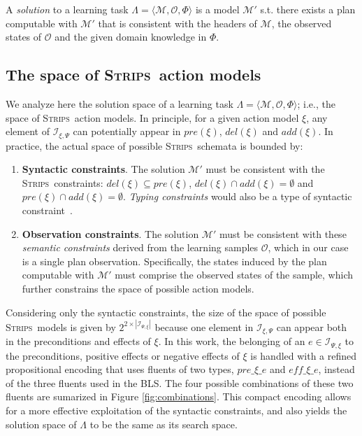\documentclass{article}
\newcommand{\tup}[1]{{\langle #1 \rangle}}
\newcommand{\strips}{\textsc{Strips}}
\begin{document}
A {\em solution} to a learning task $\Lambda=\tup{\mathcal{M},{\mathcal O},\Phi}$ is a model $\mathcal{M}'$ s.t. there exists a plan computable with $\mathcal{M}'$ that is consistent with the headers of $\mathcal{M}$, the observed states of $\mathcal{O}$ and the given domain knowledge in $\Phi$.

\subsection{The space of \strips\ action models}

We analyze here the solution space of a learning task $\Lambda=\tup{\mathcal{M},{\mathcal O},\Phi}$; i.e., the space of \strips\ action models. In principle, for a given action model $\xi$, any element of ${\mathcal I}_{\xi,\Psi}$ can potentially appear in $pre(\xi)$, $del(\xi)$ and $add(\xi)$. In practice, the actual space of possible \strips\ schemata is bounded by:

\begin{enumerate}
\item {\bf Syntactic constraints}. The solution $\mathcal{M}'$ must be consistent with the \strips\ constraints: $del(\xi)\subseteq pre(\xi)$, $del(\xi)\cap add(\xi)=\emptyset$ and $pre(\xi)\cap add(\xi)=\emptyset$. {\em Typing constraints} would also be a type of syntactic constraint~\cite{mcdermott1998pddl}.
\item {\bf Observation constraints}. The solution $\mathcal{M}'$ must be consistent with these \emph{semantic constraints} derived from  the learning samples $\mathcal{O}$, which in our case is a single plan observation. Specifically, the states induced by the plan computable with $\mathcal{M}'$ must comprise the observed states of the sample, which further constrains the space of possible action models.
\end{enumerate}

Considering only the syntactic constraints, the size of the space of possible \strips\ models is given by $2^{2\times|{\mathcal I}_{\Psi,\xi}|}$ because one element in $\mathcal{I}_{\xi,\Psi}$ can appear both in the preconditions and effects of $\xi$. In this work, the belonging of an $e \in \mathcal{I}_{\Psi,\xi}$ to the preconditions, positive effects or negative effects of $\xi$ is handled with a refined propositional encoding that uses fluents of two types, $pre\_\xi\_e$ and $eff\_\xi\_e$, instead of the three fluents used in the BLS. The four possible combinations of these two fluents are sumarized in Figure \ref{fig:combinations}. This compact encoding allows for a more effective exploitation of the syntactic constraints, and also yields the solution space of $\Lambda$ to be the same as its search space.
\end{document}
